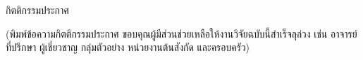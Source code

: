 \begin{center}
{\hOneSize กิตติกรรมประกาศ}
\end{center}
\vspace{6pt}

\setlength{\parindent}{1.25cm}\indent
(พิมพ์ข้อความกิตติกรรมประกาศ ขอบคุณผู้มีส่วนช่วยเหลือให้งานวิจัยฉบับนี้สำเร็จลุล่วง เช่น
อาจารย์ที่ปรึกษา ผู้เชี่ยวชาญ กลุ่มตัวอย่าง หน่วยงานต้นสังกัด และครอบครัว)

\vspace{24pt}
\begin{flushright}
[ชื่อ-นามสกุลผู้วิจัย]
\end{flushright}
